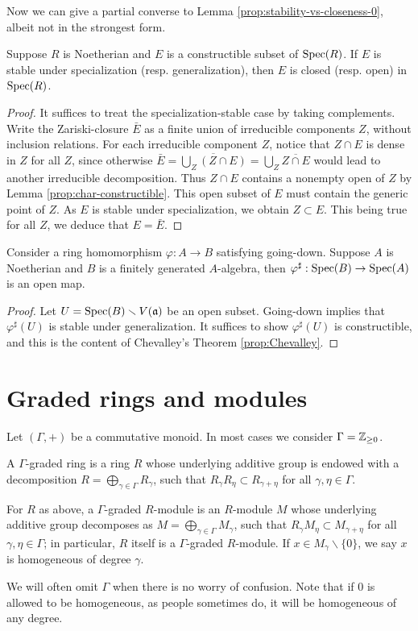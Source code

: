 Now we can give a partial converse to Lemma \ref{prop:stability-vs-closeness-0}, albeit not in the strongest form.
\begin{proposition}
	Suppose $R$ is Noetherian and $E$ is a constructible subset of $\operatorname{Spec}(R)$. If $E$ is stable under specialization (resp. generalization), then $E$ is closed (resp. open) in $\operatorname{Spec}(R)$.
\end{proposition}
\begin{proof}
	It suffices to treat the specialization-stable case by taking complements. Write the Zariski-closure $\bar{E}$ as a finite union of irreducible components $Z$, without inclusion relations. For each irreducible component $Z$, notice that $Z \cap E$ is dense in $Z$ for all $Z$, since otherwise $\bar{E} = \overline{\bigcup_Z (Z \cap E)} = \bigcup_Z \overline{Z \cap E}$ would lead to another irreducible decomposition. Thus $Z \cap E$ contains a nonempty open of $Z$ by Lemma \ref{prop:char-constructible}. This open subset of $E$ must contain the generic point of $Z$. As $E$ is stable under specialization, we obtain $Z \subset E$. This being true for all $Z$, we deduce that $E = \bar{E}$.
\end{proof}

\begin{proposition}
	Consider a ring homomorphism $\varphi: A \to B$ satisfying going-down. Suppose $A$ is Noetherian and $B$ is a finitely generated $A$-algebra, then $\varphi^\sharp: \operatorname{Spec}(B) \to \operatorname{Spec}(A)$ is an open map.
\end{proposition}
\begin{proof}
	Let $U = \operatorname{Spec}(B) \smallsetminus V(\mathfrak{a})$ be an open subset. Going-down implies that $\varphi^\sharp(U)$ is stable under generalization. It suffices to show $\varphi^\sharp(U)$ is constructible, and this is the content of Chevalley's Theorem \ref{prop:Chevalley}.
\end{proof}

\section{Graded rings and modules}
Let $(\Gamma, +)$ be a commutative monoid. In most cases we consider $\Gamma = \mathbb{Z}_{\geq 0}$.

\begin{definition}
	A $\Gamma$-graded ring is a ring $R$ whose underlying additive group is endowed with a decomposition $R = \bigoplus_{\gamma \in \Gamma} R_\gamma$, such that $R_\gamma R_\eta \subset R_{\gamma + \eta}$ for all $\gamma, \eta \in \Gamma$.
	
	For $R$ as above, a $\Gamma$-graded $R$-module is an $R$-module $M$ whose underlying additive group decomposes as $M = \bigoplus_{\gamma \in \Gamma} M_\gamma$, such that $R_\gamma M_\eta \subset M_{\gamma + \eta}$ for all $\gamma, \eta \in \Gamma$; in particular, $R$ itself is a $\Gamma$-graded $R$-module. If $x \in M_\gamma \smallsetminus \{0\}$, we say $x$ is homogeneous of degree $\gamma$.
\end{definition}
We will often omit $\Gamma$ when there is no worry of confusion. Note that if $0$ is allowed to be homogeneous, as people sometimes do, it will be homogeneous of any degree.

